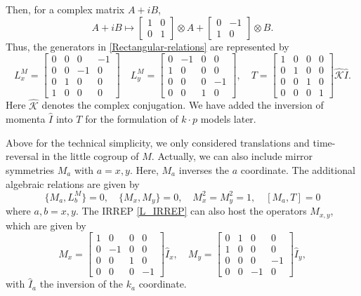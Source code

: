 \documentclass[aps,prl,twocolumn,noshowpacs,superscriptaddress]{revtex4-1}
\def \K {\hat{\mathcal{K}}}
\begin{document}
Then, for a complex matrix $A+iB$, 
\begin{equation}\label{Mps2RM}
	A+iB\mapsto \begin{bmatrix}
		1 & 0\\
		0 & 1
	\end{bmatrix}\otimes A+\begin{bmatrix}
		0 & -1\\
		1 & 0 
	\end{bmatrix}\otimes B.
\end{equation}
Thus, the generators in \eqref{Rectangular-relations} are represented by
\begin{equation}\label{L_IRREP}
	L_x^M=\begin{bmatrix}
		0 & 0 & 0 & -1\\
		0 & 0 & -1 & 0\\
		0 & 1 & 0 & 0\\
		1 & 0 & 0 & 0
	\end{bmatrix}\quad 
	L_y^M=\begin{bmatrix}
		0 & -1 & 0 & 0\\
		1 & 0 & 0 & 0\\
		0 & 0 & 0 & -1\\
		0 & 0 & 1 & 0
	\end{bmatrix},\quad T=\begin{bmatrix}
		1 & 0 & 0 & 0\\
		0 & 1 & 0 & 0\\
		0 & 0 & 1 & 0\\
		0 & 0 & 0 & 1
	\end{bmatrix}\K \hat{I}.
\end{equation}
Here $\K$ denotes the complex conjugation. We have added the inversion of momenta $\hat{I}$ into $T$ for the formulation of $k\cdot p$ models later.

Above for the technical simplicity, we only considered translations and time-reversal in the little cogroup of $M$. Actually, we can also include mirror symmetries $M_a$ with $a=x,y$. Here, $M_a$ inverses the $a$ coordinate. The additional algebraic relations are given by
\begin{equation}
	\{M_a,L_b^M\}=0,\quad \{M_x,M_y\}=0,\quad M_x^2=M_y^2=1,\quad 
	[M_a,T]=0
\end{equation}
where $a,b=x,y$. The IRREP \eqref{L_IRREP} can also host the operators $M_{x,y}$, which are given by
\begin{equation}\label{M_IRREP}
	M_x=\begin{bmatrix}
		1 & 0 & 0 & 0\\
		0 & -1 & 0 & 0\\
		0 & 0 & 1 & 0\\
		0 & 0 & 0 & -1
	\end{bmatrix}\hat{I}_x,\quad M_y=\begin{bmatrix}
		0 & 1 & 0 & 0\\
		1 & 0 & 0 & 0\\
		0 & 0 & 0 & -1\\
		0 & 0 & -1 & 0
	\end{bmatrix}\hat{I}_y,
\end{equation}
with $\hat{I}_a$ the inversion of the $k_a$ coordinate. 
\end{document}
